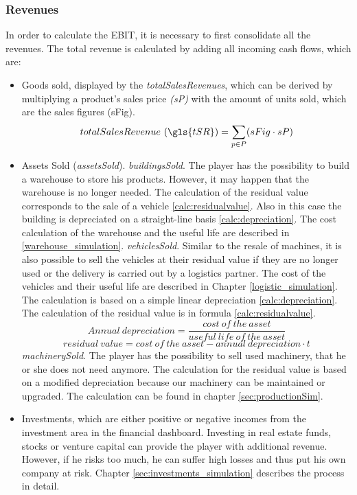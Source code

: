 \subsubsection{Revenues}
In order to calculate the EBIT, it is necessary to first consolidate all the revenues. The total revenue is calculated by adding all incoming cash flows, which are:
\begin{itemize}
    \item Goods sold, displayed by the \textit{totalSalesRevenues}, which can be derived by multiplying a product’s sales price \textit{(sP)} with the amount of units sold, which are the sales figures (\gls{sFig}). 
    \begin{equation}
        totalSalesRevenue~(\gls{tSR}) = \sum_{p \in P}(sFig \cdot sP) 
    \end{equation}
    \item Assets Sold (\textit{assetsSold}). %
        \subitem \textit{buildingsSold}. The player has the possibility to build a warehouse to store his products. However, it may happen that the warehouse is no longer needed. The calculation of the residual value corresponds to the sale of a vehicle \ref{calc:residualvalue}. Also in this case the building is depreciated on a straight-line basis \ref{calc:depreciation}. The cost calculation of the warehouse and the useful life are described in \ref{warehouse_simulation}.
        \subitem \textit{vehiclesSold}. Similar to the resale of machines, it is also possible to sell the vehicles at their residual value if they are no longer used or the delivery is carried out by a logistics partner. The cost of the vehicles and their useful life are described in Chapter \ref{logistic_simulation}. The calculation is based on a simple linear depreciation \ref{calc:depreciation}. The calculation of the residual value is in formula \ref{calc:residualvalue}.
     \begin{equation}
     \label{calc:depreciation}
     Annual \ depreciation = {\dfrac{cost \ of \ the \ asset}{useful \ life \ of \ the \ asset}}
    \end{equation}
     \begin{equation}
     \label{calc:residualvalue}
     residual \ value = {{cost \ of \ the \ asset} - {annual \ depreciation \cdot t }}    
     \end{equation}
     \subitem \textit{machinerySold}. The player has the possibility to sell used machinery, that he or she does not need anymore. The calculation for the residual value is based on a modified depreciation because our machinery can be maintained or upgraded. The calculation can be found in chapter \ref{sec:productionSim}.
    \item Investments, which are either positive or negative incomes from the investment area in the financial dashboard. Investing in real estate funds, stocks or venture capital can provide the player with additional revenue. However, if he risks too much, he can suffer high losses and thus put his own company at risk. Chapter \ref{sec:investments_simulation} describes the process in detail.
\end{itemize}

